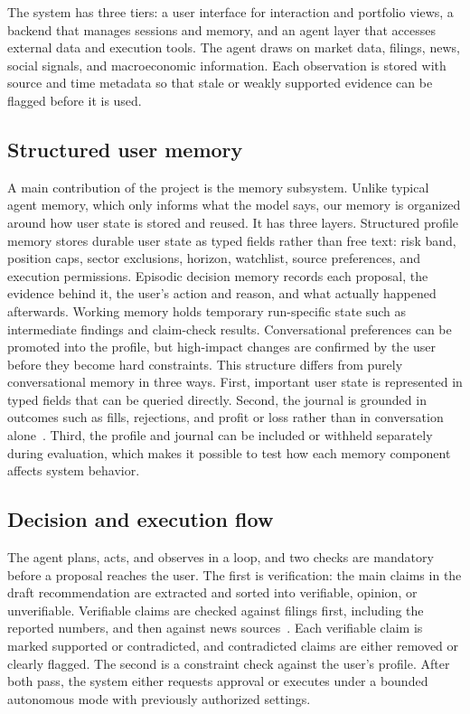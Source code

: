 \documentclass{article}
\begin{document}
The system has three tiers: a user interface for interaction and portfolio views, a backend that
manages sessions and memory, and an agent layer that accesses external data and execution tools.
The agent draws on market data, filings, news, social signals, and macroeconomic information.
Each observation is stored with source and time metadata so that stale or weakly supported
evidence can be flagged before it is used.

\subsection{Structured user memory}

A main contribution of the project is the memory subsystem. Unlike typical agent memory, which
only informs what the model says, our memory is organized around how user state is stored and
reused. It has three layers. Structured profile memory stores durable user state as typed fields
rather than free text: risk band, position caps, sector exclusions, horizon, watchlist, source
preferences, and execution permissions. Episodic decision memory records each proposal, the
evidence behind it, the user's action and reason, and what actually happened afterwards.
Working memory holds temporary run-specific state such as intermediate findings and claim-check
results. Conversational preferences can be promoted into the profile, but high-impact changes are
confirmed by the user before they become hard constraints. This structure differs from purely
conversational memory in three ways. First, important user state is represented in typed fields
that can be queried directly. Second, the journal is grounded in outcomes such as fills,
rejections, and profit or loss rather than in conversation alone~\citep{reflexion}. Third, the
profile and journal can be included or withheld separately during evaluation, which makes it
possible to test how each memory component affects system behavior.

\subsection{Decision and execution flow}

The agent plans, acts, and observes in a loop, and two checks are mandatory before a proposal
reaches the user. The first is verification: the main claims in the draft recommendation are
extracted and sorted into verifiable, opinion, or unverifiable. Verifiable claims are checked
against filings first, including the reported numbers, and then against news sources~\citep{factscore}. Each verifiable claim
is marked supported or contradicted, and contradicted claims are either removed or clearly
flagged. The second is a constraint check against the user's profile. After both pass, the system
either requests approval or executes under a bounded autonomous mode with previously authorized settings.
\end{document}
